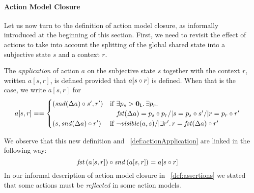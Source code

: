 \paragraph{\textbf{Action Model Closure}}
Let us now turn to the definition of action model closure, as informally introduced at the beginning of this section. First, we need to revisit the effect of actions to take into account the splitting of the global shared state into a subjective state $s$ and a context $r$.
%
%
\begin{definition}\label{def:actionApplicationPair}
The \emph{application} of action $a$ on the subjective state $s$ together with the context $r$, written $a[s,r]$, is defined provided that $a[s \circ r]$ is defined.
%
When that is the case, we write $a[s,r]$ for
\[
a[s, r] ==
\begin{cases}
	(\mathit{snd}(\Delta {a})\circ s', r')
	&\text{if } \exists p_s > \mathbf{0}_{\mathsf{L}}.\, \exists p_r.\,\\	
	& \quad \mathit{fst}(\Delta {a}) = p_s\circ p_r /| 
  s = p_s \circ s' /|   r = p_r \circ r' \\
  
  \left(s, \mathit{snd}(\Delta {a})\circ r'\right)
  & \text{if }\neg\mathit{visible}(a, s) /| \exists r'.\, r = \mathit{fst}(\Delta {a}) \circ r' 
\end{cases}
\]
\end{definition}
%
%
\noindent We observe that this new definition and ~\ref{def:actionApplication} are linked in the following way: 
%
\[
	\mathit{fst}\left(a[s, r]\right) \circ \mathit{snd}\left(a[s, r]\right) = a[s\circ r]
\]
%
In our informal description of action model closure in ~\ref{def:assertions} we stated that some actions must be \emph{reflected} in some action models. 
